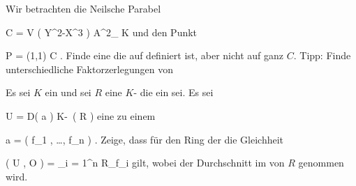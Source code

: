 {}
{





Wir betrachten die Neilsche Parabel

\mavergleichskettedisp
{\vergleichskette
{ C
}
{ =} { V \left(  Y^2-X^3  \right)
}
{ \subseteq} { {\mathbb A}^{2}_{ K }
}
{ } {
}
{ } {
}
}
{}{}{}
und den Punkt

\mavergleichskettedisp
{\vergleichskette
{ P
}
{ =} { (1,1)
}
{ \in} { C
}
{ } {
}
{ } {
}
}
{}{}{.}
Finde eine
die auf
 definiert ist, aber nicht auf ganz $C$. Tipp: Finde unterschiedliche Faktorzerlegungen von





}
{} {}

{}
{





Es sei $K$ ein
und sei $R$ eine
$K$-
die ein
sei. Es sei

\mavergleichskette
{\vergleichskette
{ U
}
{ = }{ D( {\mathfrak a} )
}
{ \subseteq }{ K\!-\!\, \left(   R   \right)
}
{    }{
}
{   }{
}
}
{}{}{}
eine
zu einem

\mavergleichskette
{\vergleichskette
{ {\mathfrak a}
}
{ = }{ \left(  f_1 , \ldots , f_n  \right)
}
{  }{
}
{    }{
}
{   }{
}
}
{}{}{.}
Zeige, dass für den Ring der
die Gleichheit

\mavergleichskettedisp
{\vergleichskette
{ \Gamma ( U , {\mathcal O} )
}
{ =} { \bigcap_{i = 1}^n R_{f_i }
}
{ } {
}
{ } {
}
{ } {
}
}
{}{}{}
gilt, wobei der Durchschnitt im
von $R$ genommen wird.





}
{} {}

